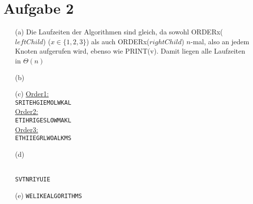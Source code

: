 \documentclass{article}
\begin{document}
\section{Aufgabe 2}
\begin{enumerate}
\item[(a)]
Die Laufzeiten der Algorithmen sind gleich, da sowohl ORDERx($leftChild$) 
($x \in \{1,2,3\} $) als auch ORDERx($rightChild$) $n$-mal, also an jedem 
Knoten aufgerufen wird, ebenso wie PRINT(v). Damit liegen alle 
Laufzeiten in $\Theta(n)$
\item[(b)]
\item[(c)]
\underline{Order1:}\\
\texttt{SRITEHGIEMOLWKAL}\\

\underline{Order2:}\\
\texttt{ETIHRIGESLOWMAKL}\\

\underline{Order3:}\\
\texttt{ETHIIEGRLWOALKMS}\\

\item[(d)] ~ \\
 \\
\texttt{SVTNRIYUIE}
\item[(e)]
\texttt{WELIKEALGORITHMS}
\end{enumerate}
\end{document}

